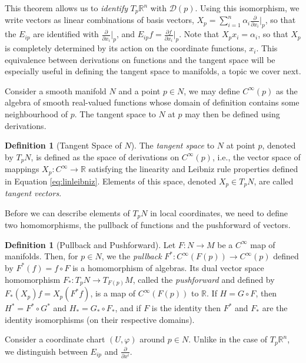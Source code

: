 \documentclass[psamsfonts]{amsart}
\theoremstyle{definition}
\newtheorem{defn}[thm]{Definition}
\theoremstyle{remark}
\newcommand*\R{\mathds{R}}
\numberwithin{equation}{section}
\begin{document}
This theorem allows us to \textit{identify} $T_p\R^n$ with $\mathscr{D}(p)$. Using this isomorphism, we write vectors as linear combinations of basis vectors, $X_p = \sum_{i = 1}^n \alpha_i \frac{\partial}{\partial x_i}\bigr|_p$, so that the $E_{ip}$ are identified with $\frac{\partial}{\partial x_i}\bigr|_p$, and $E_{ip}f = \frac{\partial f }{ \partial x_i}\bigr|_p$. Note that $X_p x_i = \alpha_i$, so that $X_p$ is completely determined by its action on the coordinate functions, $x_i$. This equivalence between derivations on functions and the tangent space will be especially useful in defining the tangent space to manifolds, a topic we cover next. 

Consider a smooth manifold $N$ and a point $p \in N$, we may define $C^{\infty}(p)$ as the algebra of smooth real-valued functions whose domain of definition contains some neighbourhood of $p$. The tangent space to $N$ at $p$ may then be defined using derivations. 
\begin{defn}[Tangent Space of $N$]\label{def:tangentspace}
The \textit{tangent space} to $N$ at point $p$, denoted by $T_pN$, is defined as the space of derivations on $C^{\infty}(p)$, i.e., the vector space of mappings $X_p: C^{\infty}\rightarrow \R$ satisfying the linearity and Leibniz rule properties defined in Equation \ref{eq:linleibniz}. Elements of this space, denoted $X_p\in T_pN$, are called \textit{tangent vectors}. 
\end{defn} 

Before we can describe elements of $T_pN$ in local coordinates, we need to define two homomorphisms, the pullback of functions and the pushforward of vectors. 

\begin{defn}[Pullback and Pushforward]
Let $F:N\rightarrow M$ be a $C^{\infty}$ map of manifolds. Then, for $p\in N$, we the \textit{pullback} $F^*:C^{\infty}(F(p))\rightarrow C^{\infty}(p)$ defined by $F^*(f) = f\circ F$ is a homomorphism of algebras. Its dual vector space homomorphism $F_*:T_pN \rightarrow T_{F(p)}M$, called the \textit{pushforward} and defined by $F_*(X_p)f = X_p(F^*f)$, is a map of $C^{\infty}(F(p))$ to $\R$. If $H = G\circ F$, then $H^* = F^* \circ G^*$ and $H_* = G_* \circ F_*$, and if $F$ is the identity then $F^*$ and $F_*$ are the identity isomorphisms (on their respective domains). 
\end{defn}

Consider a coordinate chart $(U, \varphi)$ around $p\in N$. 
Unlike in the case of $T_p\R^n$, we distinguish between $E_{ip}$ and $\frac{\partial}{\partial x^i}$. 
\end{document}
